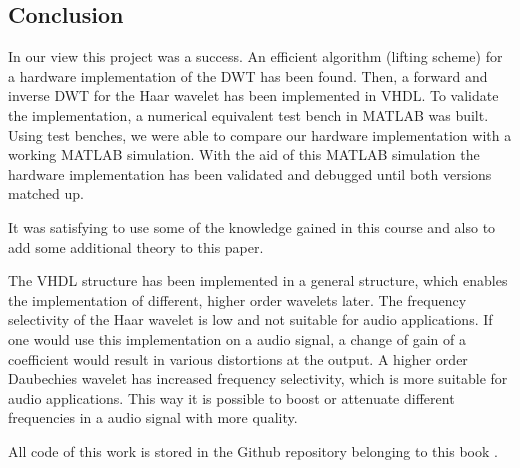 \begin{refsection}
\section{Conclusion}

In our view this project was a success.
An efficient algorithm (lifting scheme) for a hardware implementation of the DWT has been found.
Then, a forward and inverse DWT for the Haar wavelet has been implemented in VHDL.
To validate the implementation, a numerical equivalent test bench in MATLAB was built.
Using test benches, we were able to compare our hardware implementation with a working MATLAB simulation.
With the aid of this MATLAB simulation the hardware implementation has been validated and debugged until both versions matched up.

It was satisfying to use some of the knowledge gained in this course and also to add some additional theory to this paper.

The VHDL structure has been implemented in a general structure, which enables the implementation of different, higher order wavelets later. 
The frequency selectivity of the Haar wavelet is low and not suitable for audio applications.
If one would use this implementation on a audio signal, a change of gain of a coefficient would result in various distortions at the output. 
A higher order Daubechies wavelet has increased frequency selectivity, which is more suitable for audio applications.
This way it is possible to boost or attenuate different frequencies in a audio signal with more quality. 

All code of this work is stored in the Github repository belonging to this book \cite{fpga:gitrepo-wavelets}.

\printbibliography[heading=subbibliography]
\end{refsection}
